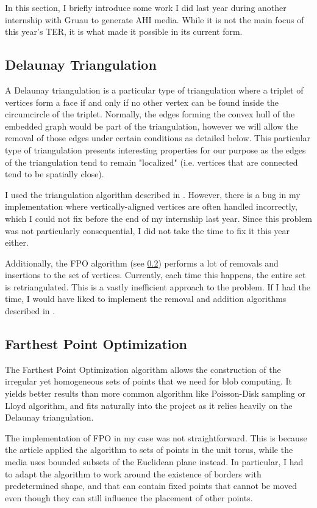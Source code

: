 \documentclass{report}
\begin{document}
In this section, I briefly introduce some work I did last year during another internship with Gruau to generate AHI media. While it is not the main focus of this year's TER, it is what made it possible in its current form.

\subsection{Delaunay Triangulation}

A Delaunay triangulation is a particular type of triangulation where a triplet of vertices form a face if and only if no other vertex can be found inside the circumcircle of the triplet. Normally, the edges forming the convex hull of the embedded graph would be part of the triangulation, however we will allow the removal of those edges under certain conditions as detailed below. This particular type of triangulation presents interesting properties for our purpose as the edges of the triangulation tend to remain "localized" (i.e. vertices that are connected tend to be spatially close).

I used the triangulation algorithm described in \cite{build_delaunay}. However, there is a bug in my implementation where vertically-aligned vertices are often handled incorrectly, which I could not fix before the end of my internship last year. Since this problem was not particularly consequential, I did not take the time to fix it this year either.

Additionally, the FPO algorithm (see \ref{fpo}) performs a lot of removals and insertions to the set of vertices. Currently, each time this happens, the entire set is retriangulated. This is a vastly inefficient approach to the problem. If I had the time, I would have liked to implement the removal and addition algorithms described in \cite{build_delaunay, remove_delaunay}.

\subsection{Farthest Point Optimization}
\label{fpo}

The Farthest Point Optimization algorithm \supercite{FPO} allows the construction of the irregular yet homogeneous sets of points that we need for blob computing. It yields better results than more common algorithm like Poisson-Disk sampling or Lloyd algorithm, and fits naturally into the project as it relies heavily on the Delaunay triangulation.

The implementation of FPO in my case was not straightforward. This is because the article applied the algorithm to sets of points in the unit torus, while the media uses bounded subsets of the Euclidean plane instead. In particular, I had to adapt the algorithm to work around the existence of borders with predetermined shape, and that can contain fixed points that cannot be moved even though they can still influence the placement of other points.
\end{document}

